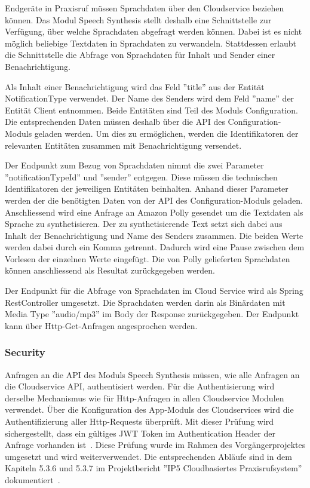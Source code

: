Endgeräte in Praxisruf müssen Sprachdaten über den Cloudservice beziehen können.
Das Modul Speech Synthesis stellt deshalb eine Schnittstelle zur Verfügung, über welche Sprachdaten abgefragt werden können.
Dabei ist es nicht möglich beliebige Textdaten in Sprachdaten zu verwandeln.
Stattdessen erlaubt die Schnittstelle die Abfrage von Sprachdaten für Inhalt und Sender einer Benachrichtigung.

Als Inhalt einer Benachrichtigung wird das Feld ''title'' aus der Entität NotificationType verwendet.
Der Name des Senders wird dem Feld ''name'' der Entität Client entnommen.
Beide Entitäten sind Teil des Moduls Configuration.
Die entsprechenden Daten müssen deshalb über die API des Configuration-Moduls geladen werden.
Um dies zu ermöglichen, werden die Identifikatoren der relevanten Entitäten zusammen mit Benachrichtigung versendet.

Der Endpunkt zum Bezug von Sprachdaten nimmt die zwei Parameter ''notificationTypeId'' und ''sender'' entgegen.
Diese müssen die technischen Identifikatoren der jeweiligen Entitäten beinhalten.
Anhand dieser Parameter werden der die benötigten Daten von der API des Configuration-Moduls geladen.
Anschliessend wird eine Anfrage an Amazon Polly gesendet um die Textdaten als Sprache zu synthetisieren.
Der zu synthetisierende Text setzt sich dabei aus Inhalt der Benachrichtigung und Name des Senders zusammen.
Die beiden Werte werden dabei durch ein Komma getrennt.
Dadurch wird eine Pause zwischen dem Vorlesen der einzelnen Werte eingefügt.
Die von Polly gelieferten Sprachdaten können anschliessend als Resultat zurückgegeben werden.

Der Endpunkt für die Abfrage von Sprachdaten im Cloud Service wird als Spring RestController umgesetzt.
Die Sprachdaten werden darin als Binärdaten mit Media Type ''audio/mp3'' im Body der Response zurückgegeben.
Der Endpunkt kann über Http-Get-Anfragen angesprochen werden.

\subsubsection{Security}

Anfragen an die API des Moduls Speech Synthesis müssen, wie alle Anfragen an die Cloudservice API, authentisiert werden.
Für die Authentisierung wird derselbe Mechanismus wie für Http-Anfragen in allen Cloudservice Modulen verwendet.
Über die Konfiguration des App-Moduls des Cloudservices wird die Authentifizierung aller Http-Requests überprüft.
Mit dieser Prüfung wird sichergestellt, dass ein gültiges JWT Token im Authentication Header der Anfrage vorhanden ist~\cite{ip5}.
Diese Prüfung wurde im Rahmen des Vorgängerprojektes umgesetzt und wird weiterverwendet.
Die entsprechenden Abläufe sind in dem Kapiteln 5.3.6 und 5.3.7 im Projektbericht ''IP5 Cloudbasiertes Praxisrufsystem'' dokumentiert~\cite{ip5}.

